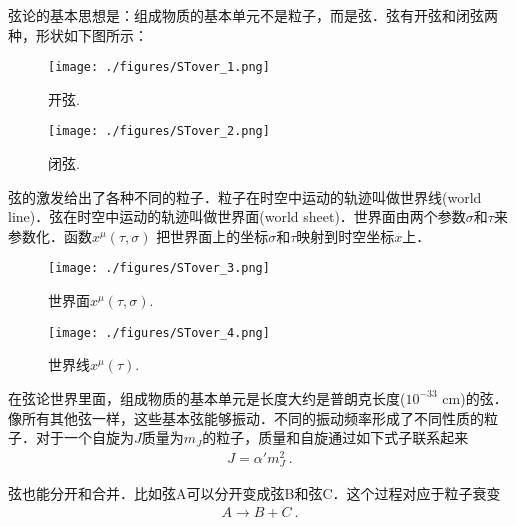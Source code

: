弦论的基本思想是：组成物质的基本单元不是粒子，而是弦．弦有开弦和闭弦两种，形状如下图所示：
\begin{figure}[ht]
\centering
\texttt{[image: ./figures/STover\_1.png]}
\caption{开弦.} \label{STover_fig1}
\end{figure}
\begin{figure}[ht]
\centering
\texttt{[image: ./figures/STover\_2.png]}
\caption{闭弦.} \label{STover_fig2}
\end{figure}
弦的激发给出了各种不同的粒子．粒子在时空中运动的轨迹叫做世界线(world line)．弦在时空中运动的轨迹叫做世界面(world sheet)．世界面由两个参数$\sigma$和$\tau$来参数化．函数$x^\mu(\tau,\sigma)$ 把世界面上的坐标$\sigma$和$\tau$映射到时空坐标$x$上．

\begin{figure}[ht]
\centering
\texttt{[image: ./figures/STover\_3.png]}
\caption{世界面$x^\mu (\tau,\sigma)$.} \label{STover_fig3}
\end{figure}

\begin{figure}[ht]
\centering
\texttt{[image: ./figures/STover\_4.png]}
\caption{世界线$x^\mu(\tau)$.} \label{STover_fig4}
\end{figure}

在弦论世界里面，组成物质的基本单元是长度大约是普朗克长度($10^{-33}$ cm)的弦．像所有其他弦一样，这些基本弦能够振动．不同的振动频率形成了不同性质的粒子．对于一个自旋为$J$质量为$m_J$的粒子，质量和自旋通过如下式子联系起来
\begin{align}
J = \alpha' m_J^2~.
\end{align}

弦也能分开和合并．比如弦A可以分开变成弦B和弦C．这个过程对应于粒子衰变
\begin{align}
A \rightarrow B + C~.
\end{align}


